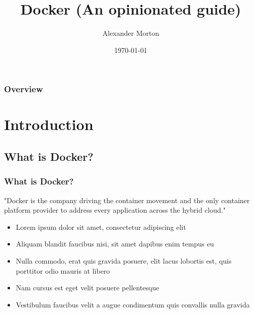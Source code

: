 \documentclass{beamer}
\title[Docker (An opinionated guide)]{Docker (An opinionated guide)} %
\author{Alexander Morton} %
\institute[Financial Cloud] %
{
Financial Cloud\\ %
\medskip
\textit{alex.morton@financial-cloud.com} %
}
\date{\today} %
\begin{document}
\begin{frame}
\titlepage %
\end{frame}

\begin{frame}
\frametitle{Overview} %
\tableofcontents %
\end{frame}


\section{Introduction} %

\subsection{What is Docker?} %

\begin{frame}
\frametitle{What is Docker?}
"Docker is the company driving the container movement and the only container platform provider to address every application across the hybrid cloud."\cite{whatisdocker}
\begin{itemize}

\item Lorem ipsum dolor sit amet, consectetur adipiscing elit
\item Aliquam blandit faucibus nisi, sit amet dapibus enim tempus eu
\item Nulla commodo, erat quis gravida posuere, elit lacus lobortis est, quis porttitor odio mauris at libero
\item Nam cursus est eget velit posuere pellentesque
\item Vestibulum faucibus velit a augue condimentum quis convallis nulla gravida
\end{itemize}

\end{frame}
\end{document}
